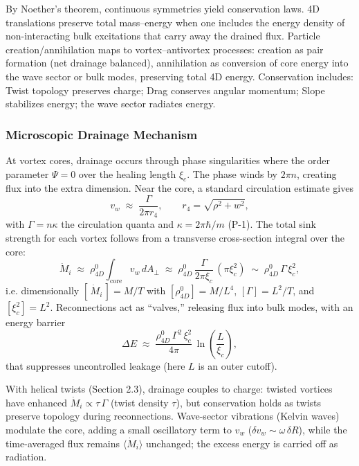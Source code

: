 By Noether's theorem, continuous symmetries yield conservation laws. 4D translations preserve total mass–energy when one includes the energy density of non-interacting bulk excitations that carry away the drained flux. Particle creation/annihilation maps to vortex–antivortex processes: creation as pair formation (net drainage balanced), annihilation as conversion of core energy into the wave sector or bulk modes, preserving total 4D energy. Conservation includes: Twist topology preserves charge; Drag conserves angular momentum; Slope stabilizes energy; the wave sector radiates energy.

\subsubsection{Microscopic Drainage Mechanism}
At vortex cores, drainage occurs through phase singularities where the order parameter $\Psi=0$ over the healing length $\xi_c$. The phase winds by $2\pi n$, creating flux into the extra dimension. Near the core, a standard circulation estimate gives
\begin{equation}
v_w \;\approx\; \frac{\Gamma}{2\pi r_4},\qquad r_4=\sqrt{\rho^2+w^2},
\end{equation}
with $\Gamma=n\kappa$ the circulation quanta and $\kappa=2\pi\hbar/m$ (P-1). The total sink strength for each vortex follows from a transverse cross-section integral over the core:
\begin{equation}
\dot M_i \;\approx\; \rho_{4D}^0 \int_{\text{core}} v_w\, dA_\perp
\;\approx\; \rho_{4D}^0\,\frac{\Gamma}{2\pi \xi_c}\,(\pi \xi_c^2)
\;\sim\; \rho_{4D}^0\,\Gamma\,\xi_c^2,
\end{equation}
i.e. dimensionally $[\,\dot M_i\,]=M/T$ with $[\rho_{4D}^0]=M/L^4$, $[\Gamma]=L^2/T$, and $[\xi_c^2]=L^2$. Reconnections act as ``valves,'' releasing flux into bulk modes, with an energy barrier
\begin{equation}
\Delta E \;\approx\; \frac{\rho_{4D}^0\,\Gamma^2\,\xi_c^2}{4\pi}\,\ln\!\left(\frac{L}{\xi_c}\right),
\end{equation}
that suppresses uncontrolled leakage (here $L$ is an outer cutoff).

With helical twists (Section 2.3), drainage couples to charge: twisted vortices have enhanced $\dot M_i \propto \tau\,\Gamma$ (twist density $\tau$), but conservation holds as twists preserve topology during reconnections. Wave-sector vibrations (Kelvin waves) modulate the core, adding a small oscillatory term to $v_w$ ($\delta v_w \sim \omega\,\delta R$), while the time-averaged flux remains $\langle \dot M_i \rangle$ unchanged; the excess energy is carried off as radiation.

